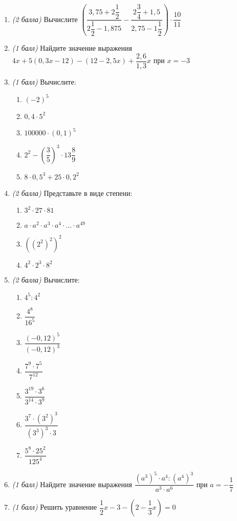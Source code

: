 \documentclass[12pt, a4paper]{article}
\begin{document}
		

\begin{enumerate}
	\item \textit{(2 балла)} Вычислите
	$\left( \dfrac{3,75+2\dfrac{1}{2}}{2\dfrac{1}{2}-1,875}-\dfrac{2\dfrac{3}{4}+1,5}{2,75-1\dfrac{1}{2}}\right)\cdot\dfrac{10}{11} $
	\item \textit{(1 балл)} Найдите значение выражения $4x+5(0,3x-12)-(12-2,5x)+\dfrac{2,6}{1,3}x$ при $x=-3$
	\item \textit{(1 балл)} Вычислите:
	\begin{multicols}{2}
		\begin{enumerate}[label=\asbuk*)]
			\item $(-2)^5$
			\item $0,4\cdot5^2$
			\item $100000\cdot(0,1)^5$
			\item $2^2-\left( \dfrac{3}{5}\right)^3\cdot13\dfrac{8}{9}$
			\item $8\cdot0,5^3+25\cdot0,2^2$
		\end{enumerate}
	\end{multicols}
	\item \textit{(2 балла)} Представьте в виде степени:
	\begin{multicols}{2}
		\begin{enumerate}[label=\asbuk*)]
			\item $3^2\cdot27\cdot81$
			\item $a\cdot a^2 \cdot a^3 \cdot a^4 \cdot ... \cdot a^{49}$
			\item $((2^2)^2)^2$
			\item $4^2\cdot2^3\cdot8^2$
		\end{enumerate}
	\end{multicols}
	\item \textit{(2 балла)} Вычислите:
	\begin{multicols}{2}
		\begin{enumerate}[label=\asbuk*)]
			\item $4^5:4^2$
			\item $\dfrac{4^8}{16^5}$
			\item $\dfrac{(-0,12)^5}{(-0,12)^3}$
			\item $\dfrac{7^9\cdot7^5}{7^{12}}$
			\item $\dfrac{3^{19}\cdot3^6}{3^{14}\cdot3^9}$
			\item $\dfrac{3^7\cdot(3^2)^3}{(3^3)^3\cdot3}$
			\item $\dfrac{5^8\cdot25^2}{125^4}$
		\end{enumerate}
	\end{multicols}
	\item \textit{(1 балл)} Найдите значение выражения $\dfrac{(a^3)^5\cdot a^4 : (a^4)^3}{a^3\cdot a^6}$ при $a=-\dfrac{1}{7}$
	\item \textit{(1 балл)} Решить уравнение $\dfrac{1}{2}x-3-\left(2-\dfrac{1}{3}x\right)=0$
\end{enumerate}
\end{document}
